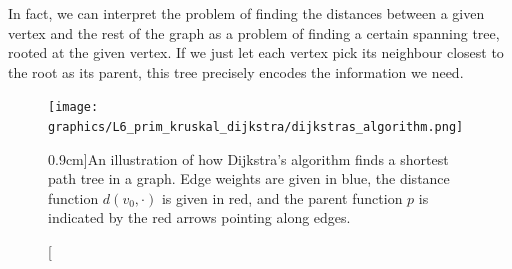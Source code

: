 \documentclass[nobib]{tufte-handout}
\begin{document}
In fact, we can interpret the problem of finding the distances between a given vertex and the rest of the graph as a problem of finding a certain spanning tree, rooted at the given vertex. If we just let each vertex pick its neighbour closest to the root as its parent, this tree precisely encodes the information we need.
\begin{figure}
  \centering
  \texttt{[image: graphics/L6\_prim\_kruskal\_dijkstra/dijkstras\_algorithm.png]}
  \caption[][0.9cm]{An illustration of how Dijkstra's algorithm finds a shortest path tree in a graph. Edge weights are given in blue, the distance function $d(v_0, \cdot)$ is given in red, and the parent function $p$ is indicated by the red arrows pointing along edges.}
  \label{fig:dijkstras_algorithm}
\end{figure}
\end{document}
